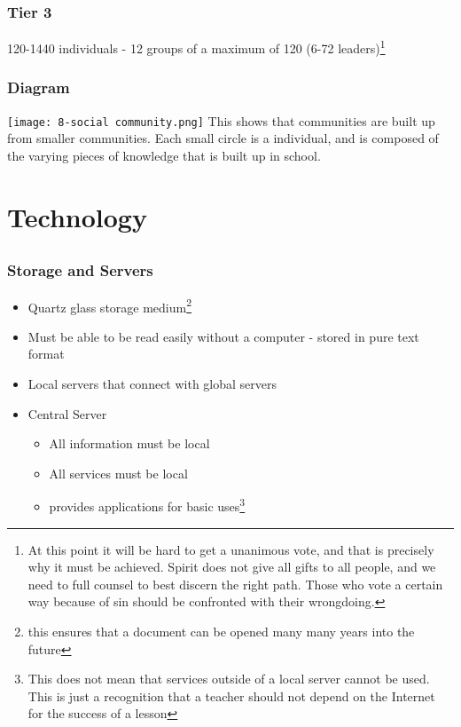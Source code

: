 \documentclass[CSHFoundation.tex]{subfiles}
\begin{document}
\subsubsection{Tier 3}

120-1440 individuals - 12 groups of a maximum of 120  (6-72 leaders)\footnote{At this point it will be hard to get a unanimous vote, and that is precisely why it must be achieved. Spirit does not give all gifts to all people, and we need to full counsel to best discern the right path. Those who vote a certain way because of sin should be confronted with their wrongdoing.}

\subsubsection{Diagram}
\texttt{[image: 8-social community.png]}
This shows that communities are built up from smaller communities. Each small circle is a individual, and is composed of the varying pieces of knowledge that is built up in school.

\section{Technology}
\subsection{}
\subsubsection{Storage and Servers}

\begin{itemize}
\item Quartz glass storage medium\footnote{this ensures that a document can be opened many many years into the future}
\item Must be able to be read easily without a computer - stored in pure text format
\item Local servers that connect with global servers
\item Central Server
\begin{itemize}
	\item All information must be local
	\item All services must be local
	\item provides applications for basic uses\footnote{This does not mean that services outside of a local server cannot be used. This is just a recognition that a teacher should not depend on the Internet for the success of a lesson}
\end{itemize}\end{itemize}
\end{document}
